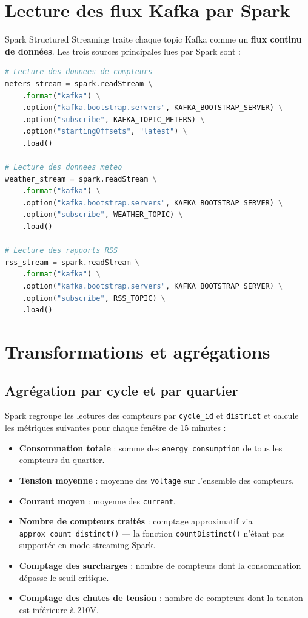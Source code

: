 \documentclass[1pt,a4paper]{report}
\begin{document}
\section{Lecture des flux Kafka par Spark}

Spark Structured Streaming traite chaque topic Kafka comme un \textbf{flux continu de données}.
Les trois sources principales lues par Spark sont :

\begin{lstlisting}[language=python, caption={Lecture des topics Kafka par Spark Structured Streaming}]
# Lecture des donnees de compteurs
meters_stream = spark.readStream \
    .format("kafka") \
    .option("kafka.bootstrap.servers", KAFKA_BOOTSTRAP_SERVER) \
    .option("subscribe", KAFKA_TOPIC_METERS) \
    .option("startingOffsets", "latest") \
    .load()

# Lecture des donnees meteo
weather_stream = spark.readStream \
    .format("kafka") \
    .option("kafka.bootstrap.servers", KAFKA_BOOTSTRAP_SERVER) \
    .option("subscribe", WEATHER_TOPIC) \
    .load()

# Lecture des rapports RSS
rss_stream = spark.readStream \
    .format("kafka") \
    .option("kafka.bootstrap.servers", KAFKA_BOOTSTRAP_SERVER) \
    .option("subscribe", RSS_TOPIC) \
    .load()
\end{lstlisting}

\section{Transformations et agrégations}

\subsection{Agrégation par cycle et par quartier}

Spark regroupe les lectures des compteurs par \texttt{cycle\_id} et \texttt{district}
et calcule les métriques suivantes pour chaque fenêtre de 15 minutes :

\begin{itemize}
    \item \textbf{Consommation totale} : somme des \texttt{energy\_consumption} de tous
    les compteurs du quartier.
    \item \textbf{Tension moyenne} : moyenne des \texttt{voltage} sur l'ensemble des compteurs.
    \item \textbf{Courant moyen} : moyenne des \texttt{current}.
    \item \textbf{Nombre de compteurs traités} : comptage approximatif via
    \texttt{approx\_count\_distinct()} — la fonction \texttt{countDistinct()} n'étant
    pas supportée en mode streaming Spark.
    \item \textbf{Comptage des surcharges} : nombre de compteurs dont la consommation
    dépasse le seuil critique.
    \item \textbf{Comptage des chutes de tension} : nombre de compteurs dont la tension
    est inférieure à 210V.
\end{itemize}
\end{document}
